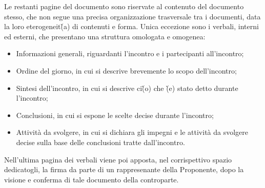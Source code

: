 \begin{itemize}
Le restanti pagine del documento sono riservate al contenuto del documento stesso, che non segue una precisa organizzazione trasversale tra i documenti, data la loro eterogeneit\`(a) di contenuti e forma.
Unica eccezione sono i verbali, interni ed esterni, che presentano una struttura omologata e omogenea:
\begin{itemize}
    \item Informazioni generali, riguardanti l'incontro e i partecipanti all'incontro;
    \item Ordine del giorno, in cui si descrive brevemente lo scopo dell'incontro;
    \item Sintesi dell'incontro, in cui si descrive ci\`(o) che \`(e) stato detto durante l'incontro;
    \item Conclusioni, in cui si espone le scelte decise durante l'incontro;
    \item Attività da svolgere, in cui si dichiara gli impegni e le attività da svolgere decise sulla base delle conclusioni tratte dall'incontro.
\end{itemize}
Nell'ultima pagina dei verbali viene poi apposta, nel corrispettivo spazio dedicatogli, la firma da parte di un rappresenante della Proponente, dopo la visione e conferma di tale documento della controparte.


\end{itemize}
